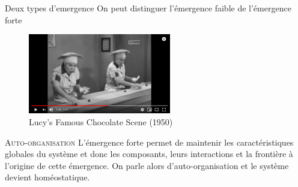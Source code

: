 \documentclass[newPxFont]{beamer}
\begin{document}

\begin{frame}[c]{Deux types d'emergence}
\vspace{-1cm}
On peut distinguer l’émergence faible de l’émergence forte

\begin{figure}
  \includegraphics[height=3.5cm]{img/Screenshot_2019-11-18 (143) Lucy's Famous Chocolate Scene - YouTube}
  \caption{Lucy's Famous Chocolate Scene (1950)}
\end{figure}

\small{
  \begin{alertblock}{\textsc{Auto-organisation}}
      L'émergence forte permet de maintenir les caractéristiques globales du système et donc les composants, leurs interactions et la frontière à l’origine de cette émergence. On parle alors d’auto-organisation et le système devient homéostatique.
  \end{alertblock}
}

\end{frame}
\end{document}
